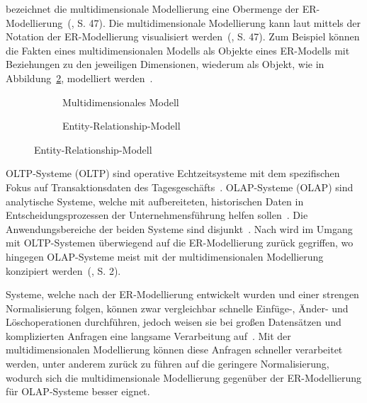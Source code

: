\documentclass[
  language=german, %
  type=bachelor%
]{isthesis}
\begin{document}
\begin{content}
  \textsc{\citeauthor{ballard1998data}} bezeichnet die multidimensionale
  Modellierung eine Obermenge der ER-Modellierung~(\citeyear{ballard1998data},
  S. 47). Die multidimensionale Modellierung kann laut
  \textsc{\citeauthor{ballard1998data}} mittels der Notation der
  ER-Modellierung visualisiert werden~(\citeyear{ballard1998data}, S. 47). Zum
  Beispiel können die Fakten eines multidimensionalen Modells als Objekte eines
  ER-Modells mit Beziehungen zu den jeweiligen Dimensionen, wiederum als
  Objekt, wie in Abbildung~\ref{vergleich-erm}, modelliert werden~\cite[][S.
  48]{ballard1998data}. 

  \begin{figure}[caption={Vergleich multidimensionale Modellierung und ERM}, label={}]
    \centering
    \begin{subfigure}{.49\textwidth}
      \centering
      \resizebox{\linewidth}{!}{}
      \caption{Multidimensionales Modell}
    \end{subfigure}
    \begin{subfigure}{.49\textwidth}
      \centering
      \resizebox{\linewidth}{!}{}
      \caption{Entity-Relationship-Modell}\label{vergleich-erm}
    \end{subfigure}
  \end{figure}

  \acrlong{OLTP}-Systeme (\acrshort{OLTP}) sind operative Echtzeitsysteme mit dem
  spezifischen Fokus auf Transaktionsdaten des Tagesgeschäfts~\cite[][S.
  11]{gabriel2009data}. \acrlong{OLAP}-Systeme (\acrshort{OLAP}) sind analytische Systeme,
  welche mit aufbereiteten, historischen Daten in Entscheidungsprozessen der
  Unternehmensführung helfen sollen~\cite[][S. 1]{chaudhuri1997overview}. Die
  Anwendungsbereiche der beiden Systeme sind disjunkt~\cite[][S.
  334]{chamoni2000line}. Nach \textsc{\citeauthor{phipps2002automating}} wird
  im Umgang mit \acrshort{OLTP}-Systemen überwiegend auf die ER-Modellierung
  zurück gegriffen, wo hingegen \acrshort{OLAP}-Systeme meist mit der
  multidimensionalen Modellierung konzipiert werden~(\citeyear{phipps2002automating}, S. 2). 

  Systeme, welche nach der ER-Modellierung entwickelt wurden und einer strengen
  Normalisierung folgen, können zwar vergleichbar schnelle Einfüge-, Änder- und
  Löschoperationen durchführen, jedoch weisen sie bei großen Datensätzen und
  komplizierten Anfragen eine langsame Verarbeitung auf~\cite[][S.
  52]{ballard2012dimensional}. Mit der multidimensionalen Modellierung können diese
  Anfragen schneller verarbeitet werden\cite[][S.  52]{ballard2012dimensional},
  unter anderem zurück zu führen auf die geringere Normalisierung, wodurch
  sich die multidimensionale Modellierung gegenüber der ER-Modellierung für
  \acrshort{OLAP}-Systeme besser eignet.



\end{content}
\end{document}
